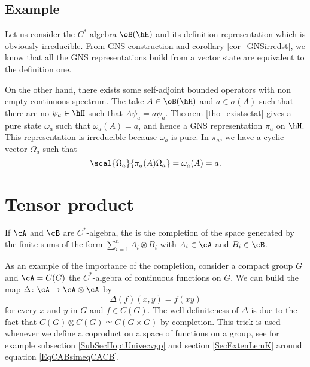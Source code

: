\subsection{Example}

Let us consider the $C^*$-algebra $\oB(\hH)$ and its definition representation which is obviously irreducible. From GNS construction and corollary \ref{cor_GNSirredst}, we know that all the GNS representations build from a vector state are equivalent to the definition one.

On the other hand, there exists some self-adjoint bounded operators with non empty continuous spectrum. The take $A\in\oB(\hH)$ and $a\in\sigma(A)$ such that there are no $\psi_a\in\hH$ such that $A\psi_a=a\psi_a$. Theorem \ref{tho_existsetat} gives a pure state $\omega_a$ such that $\omega_a(A)=a$, and hence a GNS representation $\pi_a$ on $\hH$. This representation is irreducible because $\omega_a$ is pure. In $\pi_a$, we have  a cyclic vector $\Omega_a$ such that
\[ 
  \scal{\Omega_a}{\pi_a(A)\Omega_a}=\omega_a(A)=a.
\]

\section{Tensor product}            \label{SecTensProdCSA}

If $\cA$ and $\cB$ are $C^*$-algebra, the  is the completion of the space generated by the finite sums of the form $\sum_{i=1}^n A_i\otimes B_i$ with $A_i\in\cA$ and $B_i\in\cB$.

As an example of the importance of the completion, consider a compact group $G$ and $\cA=C(G)$ the $C^*$-algebra of continuous functions on $G$. We can build the map $\Delta\colon \cA\to \cA\otimes \cA$ by
\begin{equation}
    \Delta(f)(x,y)=f(xy)
\end{equation}
for every $x$ and $y$ in $G$ and $f\in C(G)$. The well-definiteness of $\Delta$ is due to the fact that $C(G)\otimes C(G)\simeq C(G\times G)$ by completion. This trick is used whenever we define a coproduct on a space of functions on a group, see for example subsection \ref{SubSecHoptUnivecvgp} and section \ref{SecExtenLemK} around equation \eqref{EqCABsimeqCACB}.

